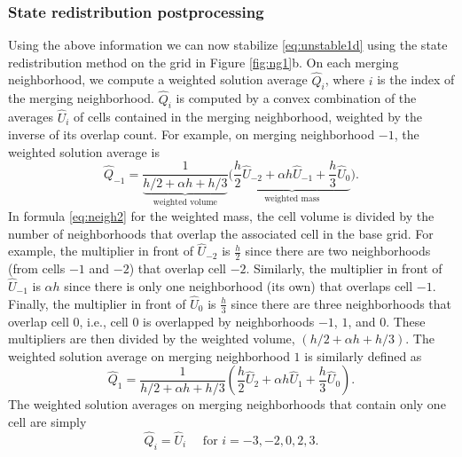 \subsubsection*{State redistribution postprocessing}
Using the above information we can now stabilize \eqref{eq:unstable1d} using the state redistribution 
method on the grid in Figure \ref{fig:ng1}b.  
On each merging neighborhood, we compute a weighted solution average $\widehat Q_i$, where $i$ is the 
index of the merging neighborhood. 
$\widehat Q_i$ is computed by a convex combination of the averages $\widehat{U}_i$ of cells contained in the 
merging neighborhood, weighted by the inverse of its overlap count. 
For example, on merging neighborhood $-1$, the weighted solution average is
\begin{equation}\label{eq:neigh2}
\widehat{Q}_{-1} = \frac{1}{\underbrace{h/2 + \alpha h + h/3}_{\text{weighted volume}}}\biggr( \underbrace{\frac{h}{2} \widehat{U}_{-2} + \alpha h \widehat{U}_{-1} + \frac{h}{3}\widehat{U}_{0}}_{\text{weighted mass}} \biggr).
\end{equation}
In formula \eqref{eq:neigh2}  for the weighted mass,
the cell volume is divided by the number of neighborhoods that overlap the associated cell 
in the base grid. 
For example, the multiplier in front of $\widehat{U}_{-2}$ is $\frac{h}{2}$ since there are 
two neighborhoods (from cells $-1$ and $-2$) that overlap cell $-2$.  
Similarly, the multiplier in front of $\widehat{U}_{-1}$ is $\alpha h$ since there is only 
one neighborhood (its own) that overlaps cell $-1$.
Finally, the multiplier in front of $\widehat{U}_{0}$ is $\frac{h}{3}$ since there are three neighborhoods that overlap cell $0$, i.e., cell $0$ is overlapped by neighborhoods $-1$, $1$, and $0$.
These multipliers are then divided by the weighted volume,  $(h/2 + \alpha h + h/3)$.
The weighted solution average on merging neighborhood $1$ is similarly defined as
\begin{equation}\label{eq:neigh3}
\widehat{Q}_{1} = \frac{1}{h/2 + \alpha h + h/3}\left( \frac{h}{2} \widehat{U}_{2} + \alpha h \widehat{U}_{1} + \frac{h}{3}\widehat{U}_{0} \right).
\end{equation}
The weighted solution averages on merging neighborhoods that contain only one cell are simply 
\begin{equation}\label{eq:neigh1}
\widehat{Q}_i = \widehat{U}_i \quad \text{ for } i = -3,-2,0,2,3.
\end{equation}

